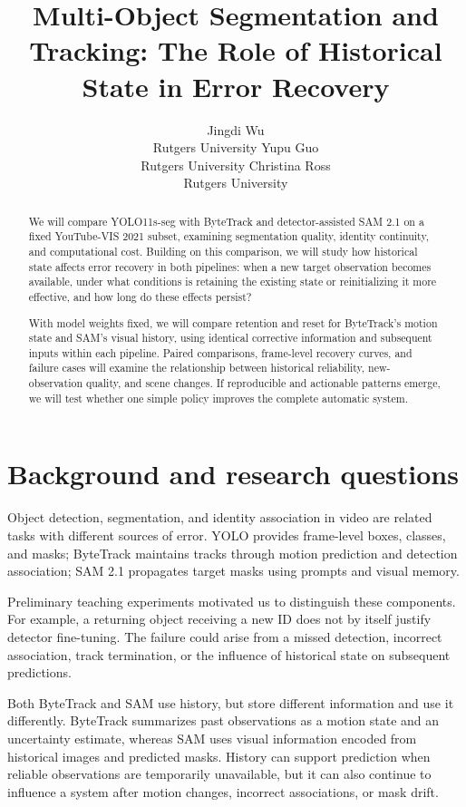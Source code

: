 \documentclass{article}
\title{Multi-Object Segmentation and Tracking: The Role of Historical State in Error Recovery}
\author{Jingdi Wu\\
{\normalfont Rutgers University}
\And
Yupu Guo\\
{\normalfont Rutgers University}
\And
Christina Ross\\
{\normalfont Rutgers University}}
\begin{document}
\maketitle


\begin{abstract}

We will compare YOLO11s-seg with ByteTrack and detector-assisted SAM 2.1 on a fixed YouTube-VIS 2021 subset, examining segmentation quality, identity continuity, and computational cost. Building on this comparison, we will study how historical state affects error recovery in both pipelines: when a new target observation becomes available, under what conditions is retaining the existing state or reinitializing it more effective, and how long do these effects persist?

With model weights fixed, we will compare retention and reset for ByteTrack's motion state and SAM's visual history, using identical corrective information and subsequent inputs within each pipeline. Paired comparisons, frame-level recovery curves, and failure cases will examine the relationship between historical reliability, new-observation quality, and scene changes. If reproducible and actionable patterns emerge, we will test whether one simple policy improves the complete automatic system.

\end{abstract}

\section{Background and research questions}

Object detection, segmentation, and identity association in video are related tasks with different sources of error. YOLO provides frame-level boxes, classes, and masks; ByteTrack maintains tracks through motion prediction and detection association; SAM 2.1 propagates target masks using prompts and visual memory.

Preliminary teaching experiments motivated us to distinguish these components. For example, a returning object receiving a new ID does not by itself justify detector fine-tuning. The failure could arise from a missed detection, incorrect association, track termination, or the influence of historical state on subsequent predictions.

Both ByteTrack and SAM use history, but store different information and use it differently. ByteTrack summarizes past observations as a motion state and an uncertainty estimate, whereas SAM uses visual information encoded from historical images and predicted masks. History can support prediction when reliable observations are temporarily unavailable, but it can also continue to influence a system after motion changes, incorrect associations, or mask drift.
\end{document}
